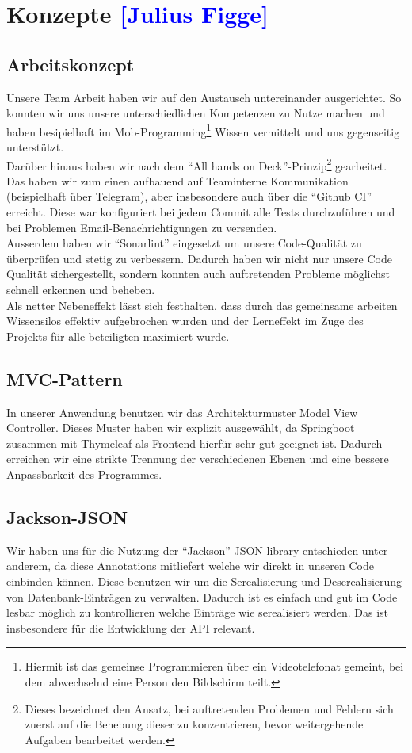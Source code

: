 

\section{Konzepte \textcolor{blue}{[Julius Figge]}}

\subsection{Arbeitskonzept}
Unsere Team Arbeit haben wir auf den Austausch untereinander ausgerichtet.
So konnten wir uns unsere unterschiedlichen Kompetenzen zu Nutze machen und haben besipielhaft im Mob-Programming\footnote{Hiermit ist das gemeinse Programmieren über ein Videotelefonat gemeint, bei dem abwechselnd eine Person den Bildschirm teilt.} Wissen vermittelt und uns gegenseitig unterstützt.\\
Darüber hinaus haben wir nach dem \enquote{All hands on Deck}-Prinzip\footnote{Dieses bezeichnet den Ansatz, bei auftretenden Problemen und Fehlern sich zuerst auf die Behebung dieser zu konzentrieren, bevor weitergehende Aufgaben bearbeitet werden.} gearbeitet.\\
Das haben wir zum einen aufbauend auf Teaminterne Kommunikation (beispielhaft über Telegram), aber insbesondere auch über die \enquote{Github CI} erreicht.
Diese war konfiguriert bei jedem Commit alle Tests durchzuführen und bei Problemen Email-Benachrichtigungen zu versenden.\\
Ausserdem haben wir \enquote{Sonarlint} eingesetzt um unsere Code-Qualität zu überprüfen und stetig zu verbessern.
Dadurch haben wir nicht nur unsere Code Qualität sichergestellt, sondern konnten auch auftretenden Probleme möglichst schnell erkennen und beheben.\\
Als netter Nebeneffekt lässt sich festhalten, dass durch das gemeinsame arbeiten Wissensilos effektiv aufgebrochen wurden und der Lerneffekt im Zuge des Projekts für alle beteiligten maximiert wurde.

\subsection{MVC-Pattern}
In unserer Anwendung benutzen wir das Architekturmuster Model View Controller.
Dieses Muster haben wir explizit ausgewählt, da Springboot zusammen mit Thymeleaf als Frontend hierfür sehr gut geeignet ist. Dadurch erreichen wir eine strikte Trennung der verschiedenen Ebenen und eine bessere Anpassbarkeit des Programmes.

\subsection{Jackson-JSON}
Wir haben uns für die Nutzung der \enquote{Jackson}-JSON library entschieden unter anderem, da diese Annotations mitliefert welche wir direkt in unseren Code einbinden können. Diese benutzen wir um die Serealisierung und Deserealisierung von Datenbank-Einträgen zu verwalten. Dadurch ist es einfach und gut im Code lesbar möglich zu kontrollieren welche Einträge wie serealisiert werden. Das ist insbesondere für die Entwicklung der API relevant.